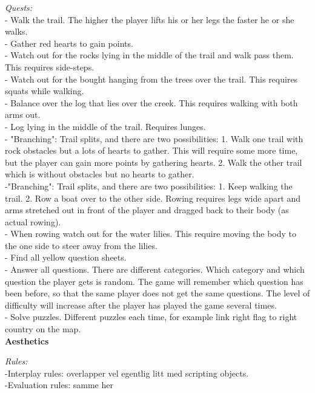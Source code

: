 \emph{Quests:} \\
- Walk the trail. The higher the player lifts his or her legs the faster he or she walks.\\
- Gather red hearts to gain points. \\
- Watch out for the rocks lying in the middle of the trail and walk pass them. This requires side-steps. \\
- Watch out for the bought hanging from the trees over the trail. This requires squats while walking.\\
- Balance over the log that lies over the creek. This requires walking with both arms out. \\
- Log lying in the middle of the trail. Requires lunges. \\
- "Branching": Trail splits, and there are two possibilities: 1. Walk one trail with rock obstacles but a lots of hearts to gather. This will require some more time, but the player can gain more points by gathering hearts. 2. Walk the other trail which is without obstacles but no hearts to gather. \\
-"Branching": Trail splits, and there are two possibilities: 1. Keep walking the trail. 2. Row a boat over to the other side. Rowing requires legs wide apart and arms stretched out in front of the player and dragged back to their body (as actual rowing). \\
- When rowing watch out for the water lilies. This require moving the body to the one side to steer away from the lilies. \\
- Find all yellow question sheets. \\
- Answer all questions. There are different categories. Which category and which question the player gets is random. The game will remember which question has been before, so that the same player does not get the same questions. The level of difficulty will increase after the player has played the game several times. \\
- Solve puzzles. Different puzzles each time, for example link right flag to right country on the map.\\

\textbf{Aesthetics}

\emph{Rules:} \\
-Interplay rules: overlapper vel egentlig litt med scripting objects. \\
-Evaluation rules: samme her \\

